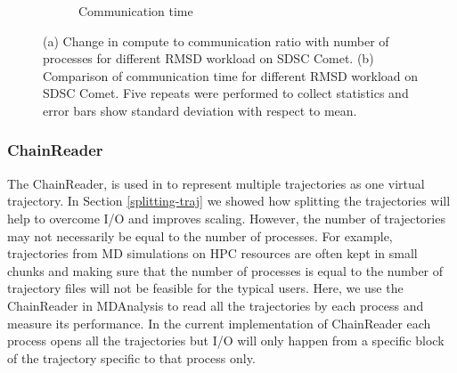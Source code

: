\begin{figure}[ht!]
\begin{subfigure}{.4\textwidth}
  \caption{Communication time}
  \label{fig:MPItottime-chain-reader}
\end{subfigure}
\caption{(a) Change in compute to communication ratio with number of processes for different RMSD workload on SDSC Comet. 
(b) Comparison of communication time for different RMSD workload on SDSC Comet.
Five repeats were performed to collect statistics and error bars show standard deviation with respect to mean.}
\label{fig:tcom_tcomm_effect}
\end{figure}

\subsubsection{ChainReader}
The ChainReader, is used in  to represent multiple trajectories as one virtual trajectory. 
In Section \ref{splitting-traj} we showed how splitting the trajectories will help to overcome I/O and improves scaling. 
However, the number of trajectories may not necessarily be equal to the number of processes.
For example, trajectories from MD simulations on HPC resources are often kept in small chunks and making sure that the number of processes is equal to the number of trajectory files will not be feasible for the typical users. 
Here, we use the ChainReader in MDAnalysis to read all the trajectories by each process and measure its performance. 
In the current implementation of ChainReader each process opens all the trajectories but I/O will only happen from a specific block of the trajectory specific to that process only.
 
